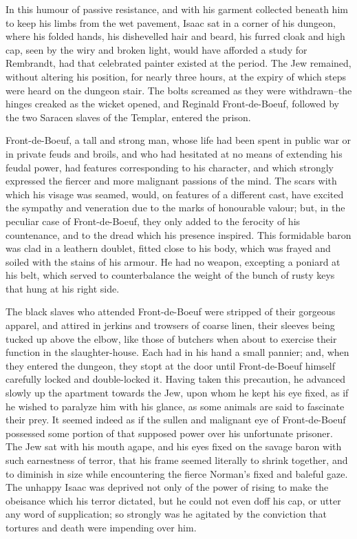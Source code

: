 In this humour of passive resistance, and with his garment collected
beneath him to keep his limbs from the wet pavement, Isaac sat in a
corner of his dungeon, where his folded hands, his dishevelled hair and
beard, his furred cloak and high cap, seen by the wiry and broken light,
would have afforded a study for Rembrandt, had that celebrated painter
existed at the period. The Jew remained, without altering his position,
for nearly three hours, at the expiry of which steps were heard on the
dungeon stair. The bolts screamed as they were withdrawn--the hinges
creaked as the wicket opened, and Reginald Front-de-Boeuf, followed by
the two Saracen slaves of the Templar, entered the prison.

Front-de-Boeuf, a tall and strong man, whose life had been spent in
public war or in private feuds and broils, and who had hesitated at no
means of extending his feudal power, had features corresponding to his
character, and which strongly expressed the fiercer and more malignant
passions of the mind. The scars with which his visage was seamed, would,
on features of a different cast, have excited the sympathy and
veneration due to the marks of honourable valour; but, in the peculiar
case of Front-de-Boeuf, they only added to the ferocity of his
countenance, and to the dread which his presence inspired. This
formidable baron was clad in a leathern doublet, fitted close to his
body, which was frayed and soiled with the stains of his armour. He had
no weapon, excepting a poniard at his belt, which served to
counterbalance the weight of the bunch of rusty keys that hung at his
right side.

The black slaves who attended Front-de-Boeuf were stripped of their
gorgeous apparel, and attired in jerkins and trowsers of coarse linen,
their sleeves being tucked up above the elbow, like those of butchers
when about to exercise their function in the slaughter-house. Each had
in his hand a small pannier; and, when they entered the dungeon, they
stopt at the door until Front-de-Boeuf himself carefully locked and
double-locked it. Having taken this precaution, he advanced slowly up
the apartment towards the Jew, upon whom he kept his eye fixed, as if he
wished to paralyze him with his glance, as some animals are said to
fascinate their prey. It seemed indeed as if the sullen and malignant
eye of Front-de-Boeuf possessed some portion of that supposed power over
his unfortunate prisoner. The Jew sat with his mouth agape, and his eyes
fixed on the savage baron with such earnestness of terror, that his
frame seemed literally to shrink together, and to diminish in size while
encountering the fierce Norman's fixed and baleful gaze. The unhappy
Isaac was deprived not only of the power of rising to make the obeisance
which his terror dictated, but he could not even doff his cap, or utter
any word of supplication; so strongly was he agitated by the conviction
that tortures and death were impending over him.

